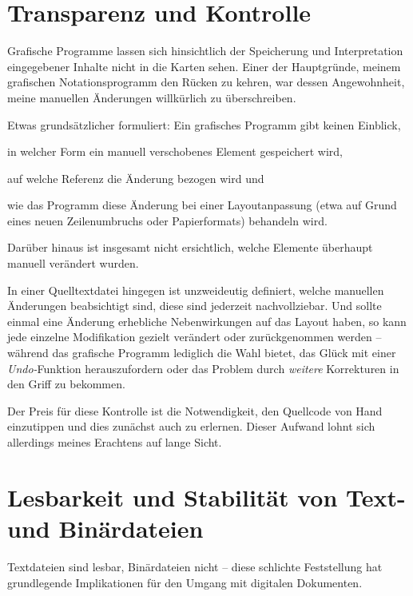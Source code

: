 \documentclass[DIV=12]{scrreprt}
\begin{document}
\section{Transparenz und Kontrolle}
\label{sec:pt_transparency-and-control}
Grafische Programme lassen sich hinsichtlich der Speicherung und Interpretation eingegebener Inhalte nicht in die Karten sehen.
Einer der Hauptgründe, meinem grafischen Notationsprogramm den Rücken zu kehren, war dessen Angewohnheit, meine manuellen Änderungen willkürlich zu überschreiben.

Etwas grundsätzlicher formuliert: Ein grafisches Programm gibt keinen Einblick, 
\begin{inparaenum}[1)]
\item in welcher Form ein manuell verschobenes Element gespeichert wird,
\item auf welche Referenz die Änderung bezogen wird und
\item wie das Programm diese Änderung bei einer Layoutanpassung (etwa auf Grund eines neuen Zeilenumbruchs oder Papierformats) behandeln wird.
\end{inparaenum}
Darüber hinaus ist insgesamt nicht ersichtlich, welche Elemente überhaupt manuell verändert wurden.

In einer Quelltextdatei hingegen ist unzweideutig definiert, welche manuellen Änderungen beabsichtigt sind, diese sind jederzeit nachvollziebar.
Und sollte einmal eine Änderung erhebliche Nebenwirkungen auf das Layout haben, so kann jede einzelne Modifikation gezielt verändert oder zurückgenommen werden -- während das grafische Programm lediglich die Wahl bietet, das Glück mit einer \emph{Undo-}Funktion herauszufordern oder das Problem durch \emph{weitere} Korrekturen in den Griff zu bekommen.

Der Preis für diese Kontrolle ist die Notwendigkeit, den Quellcode von Hand einzutippen und dies zunächst auch zu erlernen.
Dieser Aufwand lohnt sich allerdings meines Erachtens auf lange Sicht.


\section{Lesbarkeit und Stabilität von Text- und Binärdateien}
\label{sec:pt_readability-stability}
Textdateien sind lesbar, Binärdateien nicht -- diese schlichte Feststellung hat grundlegende Implikationen für den Umgang mit digitalen Dokumenten.
\end{document}
